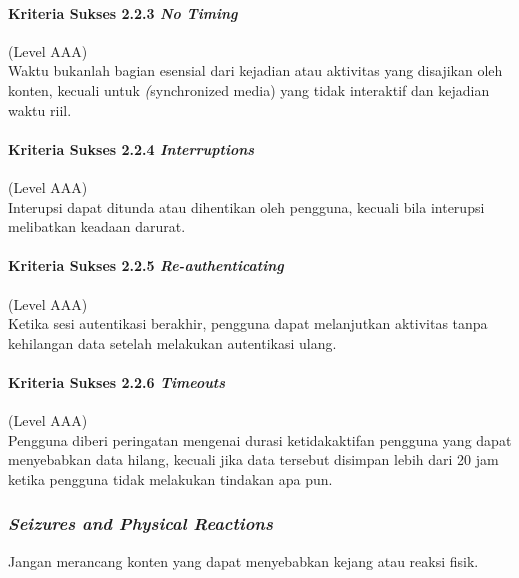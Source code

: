 \paragraph{Kriteria Sukses 2.2.3 \textit{No Timing}}
\label{sec:kriteria_sukses_2.2.3}
(Level AAA)\\

Waktu bukanlah bagian esensial dari kejadian atau aktivitas yang disajikan oleh konten, kecuali untuk \textit(synchronized media) yang tidak interaktif dan kejadian waktu riil.

\paragraph{Kriteria Sukses 2.2.4 \textit{Interruptions}}
\label{sec:kriteria_sukses_2.2.4}
(Level AAA)\\

Interupsi dapat ditunda atau dihentikan oleh pengguna, kecuali bila interupsi melibatkan keadaan darurat.

\paragraph{Kriteria Sukses 2.2.5 \textit{Re-authenticating}}
\label{sec:kriteria_sukses_2.2.5}
(Level AAA)\\

Ketika sesi autentikasi berakhir, pengguna dapat melanjutkan aktivitas tanpa kehilangan data setelah melakukan autentikasi ulang.

\paragraph{Kriteria Sukses 2.2.6 \textit{Timeouts}}
\label{sec:kriteria_sukses_2.2.6}
(Level AAA)\\

Pengguna diberi peringatan mengenai durasi ketidakaktifan pengguna yang dapat menyebabkan data hilang, kecuali jika data tersebut disimpan lebih dari 20 jam ketika pengguna tidak melakukan tindakan apa pun.

\subsubsection{\textit{Seizures and Physical Reactions}}
\label{sec:seizures_and_physical_reactions}
Jangan merancang konten yang dapat menyebabkan kejang atau reaksi fisik.

